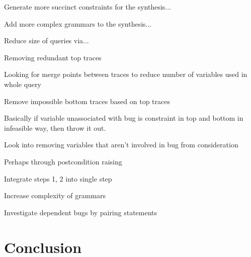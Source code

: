 \documentclass[]{article}
\begin{document}
Generate more succinct constraints for the synthesis...

Add more complex grammars to the synthesis...

Reduce size of queries via...

Removing redundant top traces

Looking for merge points between traces to reduce number of variables used in whole query

Remove impossible bottom traces based on top traces

Basically if variable unassociated with bug is constraint in top and bottom
in infeasible way, then throw it out.

Look into removing variables that aren't involved in bug from consideration

Perhaps through postcondition raising

Integrate steps 1, 2 into single step

Increase complexity of grammars

Investigate dependent bugs by pairing statements

\section{Conclusion}



\end{document}
